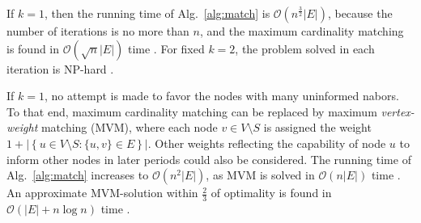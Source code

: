 \begin{remark} \label{rem:time}
If $k=1$, then the running time of Alg.\ \ref{alg:match} is $\mathcal{O}\left(n^{\frac{3}{2}}|E|\right)$, because the number of iterations is no more than $n$,
and the maximum cardinality matching is found in $\mathcal{O}\left(\sqrt{n}|E|\right)$ time \cite{hopcroft73}.
For fixed $k=2$, the problem solved in each iteration is NP-hard \cite{jansen95}.
\end{remark}

\begin{remark} \label{rem:mvm}
If $k=1$, no attempt is made to favor the nodes with many uninformed nabors.
To that end, maximum cardinality matching can be replaced by maximum \emph{vertex-weight} matching (MVM),
where each node $v\in V\setminus S$ is assigned the weight $1+\left|\left\{u\in V\setminus S: \{u,v\}\in E\right\}\right|$.
Other weights reflecting the capability of node $u$ to inform other nodes in later periods could also be considered.
The running time of Alg.\ \ref{alg:match} increases to $\mathcal{O}\left(n^2|E|\right)$, as MVM
is solved in $\mathcal{O}\left(n|E|\right)$ time \cite{dobrian19}.
An approximate MVM-solution within $\frac{2}{3}$ of optimality is found in $\mathcal{O}\left(|E|+n\log{n}\right)$ time \cite{dobrian19}.
\end{remark}
